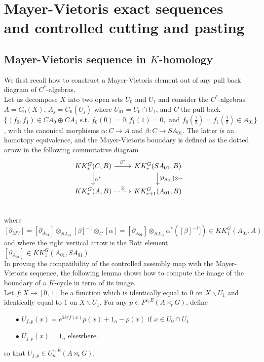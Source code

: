 \section{ Mayer-Vietoris exact sequences and controlled cutting and pasting}

\subsection{Mayer-Vietoris sequence in $K$-homology}

We first recall how to construct a Mayer-Vietoris element out of any pull back diagram of $C^*$-algebras.\\

Let us decompose $X$ into two open sets $U_0$ and $U_1$ and consider the $C^*$-algebras $A=C_0(X)$, $A_j=C_0(U_j)$ where $U_{01}=U_0\cap U_1$, and $C$ the pull-back $\{(f_0,f_1) \in CA_0\oplus CA_1 \text{ s.t. } f_0(0)=0,f_1(1)=0,\text{ and } f_0(\frac{1}{2})=f_1(\frac{1}{2})\in A_{01}\}$, with the canonical morphisms $\alpha :C \rightarrow A$ and $\beta : C \rightarrow SA_{01}$. The latter is an homotopy equivalence, and the Mayer-Vietoris boundary is defined as the dotted arrow in the following commutative diagram
\[\begin{tikzcd}
KK^G_*(C,B) \arrow{r}{\beta^*}\arrow{d}{ \alpha^*}& KK^G_*(SA_{01},B)\arrow{d}{[\partial_{A_{01}}]\otimes -}\\
KK^G_*(A,B) \arrow[dotted]{r}{\otimes}& KK^G_{*+1}(A_{01},B)\\
\end{tikzcd}\]
where $[\partial_{MV}]=[\partial_{A_{01}}]\otimes_{SA_{01}} [\beta]^{-1}\otimes_C [\alpha] = [\partial_{A_{01}}]\otimes_{SA_{01}} \alpha^*([\beta]^{-1}])\in KK^G_1(A_{01},A)$ and where the right vertical arrow is the Bott element $[\partial_{A_{01}}]\in KK_1^G(A_{01},SA_{01})$.\\

In proving the compatibility of the controlled assembly map with the Mayer-Vietoris sequence, the following lemma shows how to compute the image of 
the boundary of a $K$-cycle in term of its image.\\

Let $f : X\rightarrow [0,1]$ be a function which is identically equal to $0$ on $X\backslash U_1 $ and identically equal to $1$ on $X\backslash U_1$. For any $p\in P^{\varepsilon,E}(A\rtimes_r G) $, define 
\begin{itemize}
\item[$\bullet$] $U_{f,p}(x) = e^{2i\pi f(x)}p(x) +1_n -p(x)$ if $x\in U_0\cap U_1$
\item[$\bullet$] $U_{f,p}(x) = 1_n$ elsewhere.
\end{itemize}
so that $U_{f,p}\in U^{\varepsilon,E}_n(A\rtimes_r G)$.\\

